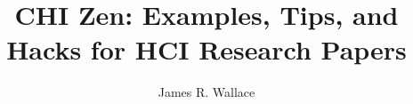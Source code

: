 \documentclass[sigconf,manuscript,screen]{acmart}
\begin{document}
\title[Examples, Tips, and Hacks for HCI Research Papers]{CHI Zen: Examples, Tips, and Hacks for HCI Research Papers}

\author{James R. Wallace}












\maketitle
\end{document}
